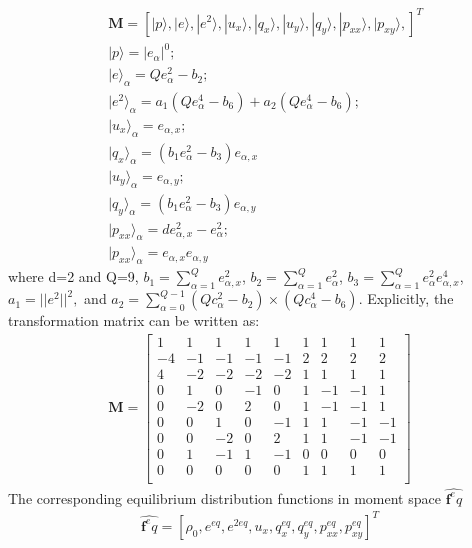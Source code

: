 \begin{align}
 & \mathbf{M}=\left[|p\rangle,|e\rangle,|e^2\rangle,|u_x\rangle,|q_x\rangle,|u_y\rangle,|q_y\rangle,|p_{xx}\rangle,|p_{xy}\rangle,\right]^T \\
 & |p\rangle = |\mathit{e}_{\alpha}|^0;\\
 & |e\rangle_{\alpha}=\mathit{Q}e_{\alpha}^2-b_2;\\
 & |e^2\rangle_{\alpha}=a_1(\mathit{Q}e_{\alpha}^4-b_6)+a_2(\mathit{Q}e_{\alpha}^4-b_6);\\
 & |u_x\rangle_{\alpha}=e_{\alpha,x}; \\
 & |q_x\rangle_{\alpha}=(\mathit{b}_1e_{\alpha}^2-b_3)e_{\alpha,x}\\
 & |u_y\rangle_{\alpha}=e_{\alpha,y}; \\
 & |q_y\rangle_{\alpha}=(\mathit{b}_1e_{\alpha}^2-b_3)e_{\alpha,y}\\
 & |p_{xx}\rangle_{\alpha}=\mathit{d}e_{\alpha,x}^2-e_{\alpha}^2; \\
 & |p_{xx}\rangle_{\alpha}=e_{\alpha,x}e_{\alpha,y}
\end{align}
\flushleft where d=2 and Q=9, $b_1=\sum_{\alpha=1}^{Q}e_{\alpha,x}^2$, $b_2=\sum_{\alpha=1}^{Q}e_{\alpha}^2$, 
$b_3=\sum_{\alpha=1}^{Q}e_{\alpha}^2e_{\alpha,x}^4$, $a_1=||e^2||^2,$ and $a_2=\sum_{\alpha=0}^{Q-1}(Qc_{\alpha}^2-b_2)\times(Qc_{\alpha}^4-b_6)$. Explicitly, the transformation matrix can be written as:
\begin{align}
\mathbf{M}= \begin{bmatrix}
 1 &  1 &  1 &  1 &  1 &  1 &  1 &  1 &  1 \\
-4 & -1 & -1 & -1 & -1 &  2 &  2 &  2 &  2 \\ 
 4 & -2 & -2 & -2 & -2 &  1 &  1 &  1 &  1 \\
 0 &  1 &  0 & -1 &  0 &  1 & -1 & -1 &  1 \\
 0 & -2 &  0 &  2 &  0 &  1 & -1 & -1 &  1 \\
 0 &  0 &  1 &  0 & -1 &  1 &  1 & -1 & -1 \\
 0 &  0 & -2 &  0 &  2 &  1 &  1 & -1 & -1 \\
 0 &  1 & -1 &  1 & -1 &  0 &  0 &  0 &  0 \\
 0 &  0 &  0 &  0 &  0 &  1 &  1 &  1 &  1 \\
\end{bmatrix}
\end{align}
The corresponding equilibrium distribution functions in moment space $\widehat{\mathbf{f}^eq}$
\begin{align}
\widehat{\mathbf{f}^eq}=\left[\rho_0,e^{eq},e^{2eq},u_x,q_x^{eq},q_y^{eq},p_{xx}^{eq},p_{xy}^{eq}\right]^T
\end{align}
